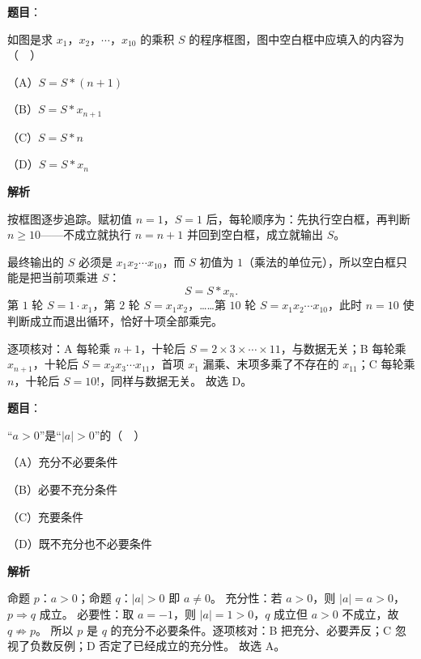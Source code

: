 \begin{answer}

\textbf{题目}：

如图是求 $x_1$，$x_2$，$\cdots$，$x_{10}$ 的乘积 $S$ 的程序框图，图中空白框中应填入的内容为（　）

（A）$S=S*(n+1)$

（B）$S=S*x_{n+1}$

（C）$S=S*n$

（D）$S=S*x_n$
\nopagebreak[4]
\begin{center}\end{center}
\nopagebreak[4]
\textbf{解析}

按框图逐步追踪。赋初值 $n=1$，$S=1$ 后，每轮顺序为：先执行空白框，再判断 $n\geqslant 10$——不成立就执行 $n=n+1$ 并回到空白框，成立就输出 $S$。

最终输出的 $S$ 必须是 $x_1x_2\cdots x_{10}$，而 $S$ 初值为 $1$（乘法的单位元），所以空白框只能是把当前项乘进 $S$：
\nopagebreak[4]
\[S=S*x_n.\]
第 $1$ 轮 $S=1\cdot x_1$，第 $2$ 轮 $S=x_1x_2$，……第 $10$ 轮 $S=x_1x_2\cdots x_{10}$，此时 $n=10$ 使判断成立而退出循环，恰好十项全部乘完。

逐项核对：A 每轮乘 $n+1$，十轮后 $S=2\times 3\times\cdots\times 11$，与数据无关；B 每轮乘 $x_{n+1}$，十轮后 $S=x_2x_3\cdots x_{11}$，首项 $x_1$ 漏乘、末项多乘了不存在的 $x_{11}$；C 每轮乘 $n$，十轮后 $S=10!$，同样与数据无关。
故选 D。


\end{answer}
\begin{answer}

\textbf{题目}：

“$a>0$”是“$|a|>0$”的（　）

（A）充分不必要条件

（B）必要不充分条件

（C）充要条件

（D）既不充分也不必要条件

\textbf{解析}

命题 $p$：$a>0$；命题 $q$：$|a|>0$ 即 $a\neq 0$。
充分性：若 $a>0$，则 $|a|=a>0$，$p\Rightarrow q$ 成立。
必要性：取 $a=-1$，则 $|a|=1>0$，$q$ 成立但 $a>0$ 不成立，故 $q\not\Rightarrow p$。
所以 $p$ 是 $q$ 的充分不必要条件。逐项核对：B 把充分、必要弄反；C 忽视了负数反例；D 否定了已经成立的充分性。
故选 A。


\end{answer}
